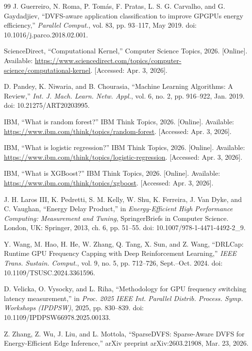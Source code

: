 \documentclass[12pt,oneside,spanish]{book}
\begin{document}
\begin{sloppypar}
\begin{thebibliography}{99}
 J. Guerreiro, N. Roma, P. Tomás, F. Pratas, L. S. G. Carvalho, and G. Gaydadjiev, ``DVFS-aware application classification to improve GPGPUs energy efficiency,'' \textit{Parallel Comput.}, vol. 83, pp. 93--117, May 2019. doi: 10.1016/j.parco.2018.02.001.

 ScienceDirect, ``Computational Kernel,'' Computer Science Topics, 2026. [Online]. Available: \url{https://www.sciencedirect.com/topics/computer-science/computational-kernel}. [Accessed: Apr. 3, 2026].

 D. Pandey, K. Niwaria, and B. Chourasia, ``Machine Learning Algorithms: A Review,'' \textit{Int. J. Mach. Learn. Netw. Appl.}, vol. 6, no. 2, pp. 916--922, Jan. 2019. doi: 10.21275/ART20203995.

 IBM, ``What is random forest?'' IBM Think Topics, 2026. [Online]. Available: \url{https://www.ibm.com/think/topics/random-forest}. [Accessed: Apr. 3, 2026].

 IBM, ``What is logistic regression?'' IBM Think Topics, 2026. [Online]. Available: \url{https://www.ibm.com/think/topics/logistic-regression}. [Accessed: Apr. 3, 2026].

 IBM, ``What is XGBoost?'' IBM Think Topics, 2026. [Online]. Available: \url{https://www.ibm.com/think/topics/xgboost}. [Accessed: Apr. 3, 2026].

 J. H. Laros III, K. Pedretti, S. M. Kelly, W. Shu, K. Ferreira, J. Van Dyke, and C. Vaughan, ``Energy Delay Product,'' in \textit{Energy-Efficient High Performance Computing: Measurement and Tuning}, SpringerBriefs in Computer Science. London, UK: Springer, 2013, ch. 6, pp. 51--55. doi: 10.1007/978-1-4471-4492-2\_9.

 Y. Wang, M. Hao, H. He, W. Zhang, Q. Tang, X. Sun, and Z. Wang, ``DRLCap: Runtime GPU Frequency Capping with Deep Reinforcement Learning,'' \textit{IEEE Trans. Sustain. Comput.}, vol. 9, no. 5, pp. 712--726, Sept.--Oct. 2024. doi: 10.1109/TSUSC.2024.3361596.

 D. Velicka, O. Vysocky, and L. Riha, ``Methodology for GPU frequency switching latency measurement,'' in \textit{Proc. 2025 IEEE Int. Parallel Distrib. Process. Symp. Workshops (IPDPSW)}, 2025, pp. 830--839. doi: 10.1109/IPDPSW66978.2025.00133.

 Z. Zhang, Z. Wu, J. Liu, and L. Mottola, ``SparseDVFS: Sparse-Aware DVFS for Energy-Efficient Edge Inference,'' arXiv preprint arXiv:2603.21908, Mar. 23, 2026.


\end{thebibliography}
\end{sloppypar}
\end{document}

